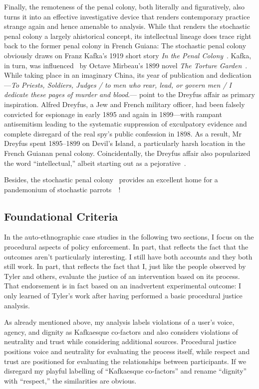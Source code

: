 Finally, the remoteness of the penal colony, both literally and figuratively,
also turns it into an effective investigative device that renders contemporary
practice strange again and hence amenable to analysis. While that renders the
stochastic penal colony a largely ahistorical concept, its intellectual lineage
does trace right back to the former penal colony in French Guiana: The
stochastic penal colony obviously draws on Franz Kafka's 1919 short story
\emph{In the Penal Colony}~\cite{Kafka1995}. Kafka, in turn, was
influenced~\cite{Robertson2017} by Octave Mirbeau's 1899 novel \emph{The Torture
Garden}~\cite{Mirbeau2008}. While taking place in an imaginary China, its year
of publication and dedication---\emph{To Priests, Soldiers, Judges / to men who
rear, lead, or govern men / I dedicate these pages of murder and blood}.---%
point to the Dreyfus affair as primary inspiration. Alfred Dreyfus, a Jew and
French military officer, had been falsely convicted for espionage in early 1895
and again in 1899---with rampant antisemitism leading to the systematic
suppression of exculpatory evidence and complete disregard of the real spy's
public confession in 1898. As a result, Mr Dreyfus spent 1895--1899 on Devil's
Island, a particularly harsh location in the French Guianan penal colony.
Coincidentally, the Dreyfus affair also popularized the word ``intellectual,''
albeit starting out as a
pejorative~\cite{Drake2005,StudentsAtTheUniversityOfBristol2021}.

Besides, the stochastic penal colony~ provides an excellent
home for a pandemonium of stochastic
parrots~~\cite{BenderGebruea2021}!


\subsection{Foundational Criteria}
\label{sec:criteria}

In the auto-ethnographic case studies in the following two sections, I focus on
the procedural aspects of policy enforcement. In part, that reflects the fact
that the outcomes aren't particularly interesting. I still have both accounts
and they both still work. In part, that reflects the fact that I, just like the
people observed by Tyler and others, evaluate the justice of an intervention
based on its process. That endorsement is in fact based on an inadvertent
experimental outcome: I only learned of Tyler's work after having performed a
basic procedural justice analysis.

As already mentioned above, my analysis labels violations of a user's voice,
agency, and dignity as Kafkaesque co-factors and also considers violations of
neutrality and trust while considering additional sources. Procedural justice
positions voice and neutrality for evaluating the process itself, while respect
and trust are positioned for evaluating the relationships between participants.
If we disregard my playful labelling of ``Kafkaesque co-factors'' and rename
``dignity'' with ``respect,'' the similarities are obvious.

